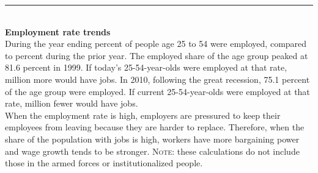 \documentclass{report}
\newcommand{\dateaxisticks}{
		axis line style={draw=none},
		max space between ticks=38,	 
		xmin={1997-01-01},
		xtick={
			{1995-01-01},
			{2000-01-01},
			{2005-01-01},
			{2010-01-01},
			{2015-01-01}},
	    minor xtick={
	    	{1994-01-01}, {1996-01-01}, {1997-01-01}, {1998-01-01}, {1999-01-01},
			{2001-01-01}, {2002-01-01}, {2003-01-01}, {2004-01-01}, 
	    	{2006-01-01}, {2007-01-01}, {2008-01-01}, {2009-01-01},
	      	{2011-01-01}, {2012-01-01}, {2013-01-01}, {2014-01-01},
	      	{2016-01-01}, {2017-01-01}, {2018-01-01}, {2019-01-01}},
	    enlarge y limits={0.08},
	    enlarge x limits={0.12},}
\newcommand{\lastpt}[1]{node[circle, 
		minimum size=3pt, inner sep=0pt, draw, fill, pos=1](#1){};}
\begin{document}
\noindent \begin{minipage}[t]{0.48\textwidth}

\noindent \textcolor{blue}{\rule[-6pt]{90mm}{24pt}}
		\vspace{-6mm}
		
		\hspace{1mm} \textcolor{white}{}
\vspace{1.1mm}

\hspace{0.8mm} 
\vspace{4mm}\\
\textbf{Employment rate trends}
\vspace{2mm}\\
During the year ending percent of people age 25 to 54 were employed, compared to percent during the prior year. The employed share of the age group peaked at 81.6 percent in 1999. If today's 25-54-year-olds were employed at that rate, million more would have jobs. In 2010, following the great recession, 75.1 percent of the age group were employed. If current 25-54-year-olds were employed at that rate, million fewer would have jobs.\\

When the employment rate is high, employers are pressured to keep their employees from leaving because they are harder to replace. Therefore, when the share of the population with jobs is high, workers have more bargaining power and wage growth tends to be stronger. \textsc{Note:} these calculations do not include those in the armed forces or institutionalized people.\\
\end{minipage}\hfill
\end{document}
